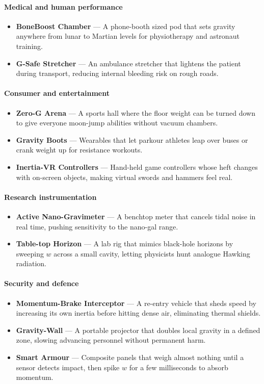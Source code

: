 \documentclass[12pt,letterpaper]{book}
\begin{document}
\paragraph{Medical and human performance}
\begin{itemize}
 \item \textbf{BoneBoost Chamber} — A phone-booth sized pod that sets gravity anywhere from lunar to Martian levels for physiotherapy and astronaut training.
 \item \textbf{G-Safe Stretcher} — An ambulance stretcher that lightens the patient during transport, reducing internal bleeding risk on rough roads.
\end{itemize}

\paragraph{Consumer and entertainment}
\begin{itemize}
 \item \textbf{Zero-G Arena} — A sports hall where the floor weight can be turned down to give everyone moon-jump abilities without vacuum chambers.
 \item \textbf{Gravity Boots} — Wearables that let parkour athletes leap over buses or crank weight up for resistance workouts.
 \item \textbf{Inertia-VR Controllers} — Hand-held game controllers whose heft changes with on-screen objects, making virtual swords and hammers feel real.
\end{itemize}

\paragraph{Research instrumentation}
\begin{itemize}
 \item \textbf{Active Nano-Gravimeter} — A benchtop meter that cancels tidal noise in real time, pushing sensitivity to the nano-gal range.
 \item \textbf{Table-top Horizon} — A lab rig that mimics black-hole horizons by sweeping $w$ across a small cavity, letting physicists hunt analogue Hawking radiation.
\end{itemize}

\paragraph{Security and defence}
\begin{itemize}
 \item \textbf{Momentum-Brake Interceptor} — A re-entry vehicle that sheds speed by increasing its own inertia before hitting dense air, eliminating thermal shields.
 \item \textbf{Gravity-Wall} — A portable projector that doubles local gravity in a defined zone, slowing advancing personnel without permanent harm.
 \item \textbf{Smart Armour} — Composite panels that weigh almost nothing until a sensor detects impact, then spike $w$ for a few milliseconds to absorb momentum.
\end{itemize}
\end{document}
